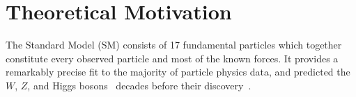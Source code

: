\chapter{Theoretical Motivation}

The Standard Model (SM) consists of 17 fundamental particles which together constitute every observed particle and most of the known forces. It provides a remarkably precise fit to the majority of particle physics data, and predicted the $W$, $Z$, and Higgs bosons~\cite{wzmass1,higgs1,higgs2} decades before their discovery~\cite{ua1w,ua2w,ua1z,ua2z}.




